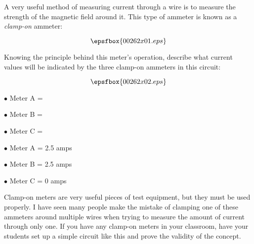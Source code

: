 

A very useful method of measuring current through a wire is to measure the strength of the magnetic field around it.  This type of ammeter is known as a {\it clamp-on} ammeter:

$$\epsfbox{00262x01.eps}$$

Knowing the principle behind this meter's operation, describe what current values will be indicated by the three clamp-on ammeters in this circuit:
 
$$\epsfbox{00262x02.eps}$$

\medskip
\item{$\bullet$} Meter A = 
\item{$\bullet$} Meter B = 
\item{$\bullet$} Meter C = 
\medskip







\medskip
\item{$\bullet$} Meter A = 2.5 amps
\item{$\bullet$} Meter B = 2.5 amps
\item{$\bullet$} Meter C = 0 amps
\medskip







Clamp-on meters are very useful pieces of test equipment, but they must be used properly.  I have seen many people make the mistake of clamping one of these ammeters around multiple wires when trying to measure the amount of current through only one.  If you have any clamp-on meters in your classroom, have your students set up a simple circuit like this and prove the validity of the concept.



